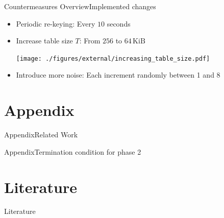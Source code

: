 \documentclass[aspectratio=169, hyperref={colorlinks=true, allcolors=SecondaryColor}, c]{beamer}
\begin{document}
	\begin{frame}[fragile]{Countermeasures Overview}{Implemented changes}
		\begin{itemize}
			\item \alert{Periodic re-keying}: Every $10$ seconds

			\item \alert{Increase table size $T$}: From $256$ to $64\,\text{KiB}$

			\texttt{[image: ./figures/external/increasing\_table\_size.pdf]} %
			\item \alert{Introduce more noise}: Each increment randomly between 1 and 8

		\end{itemize}
	\end{frame}
\else
\fi

\ifappendix
	\section{Appendix}

	\begin{frame}[fragile]{Appendix}{Related Work}
	\end{frame}

	\begin{frame}[fragile]{Appendix}{Termination condition for phase 2}
	\end{frame}
\else
\fi

\ifliterature
	\section{Literature}

	\begin{frame}[allowframebreaks]{Literature}
		\printbibliography
	\end{frame}
\end{document}
